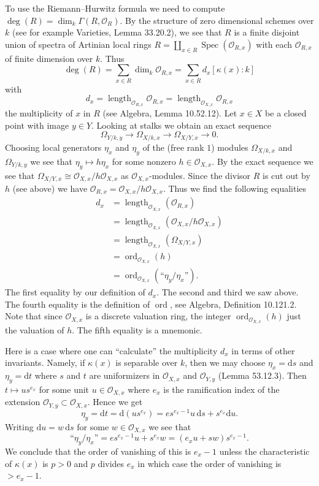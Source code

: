 \documentclass[UTF8,11pt]{ctexart}
\theoremstyle{definition}
\DeclareMathOperator{\Spec}{Spec}
\begin{document}
To use the Riemann--Hurwitz formula we need to compute $\deg(R)=\dim_k\Gamma(R,\mathcal O_R)$. By the structure of zero dimensional schemes over $k$ (see for example Varieties, Lemma 33.20.2), we see that $R$ is a finite disjoint union of spectra of Artinian local rings $R=\coprod_{x\in R}\Spec(\mathcal O_{R,x})$ with each $\mathcal O_{R,x}$ of finite dimension over $k$. Thus
\[\deg(R)=\sum_{x\in R}\dim_k\mathcal O_{R,x}=\sum_{x\in R}d_x[\kappa(x):k]\]
with
\[d_x=\operatorname{length}_{\mathcal O_{R,x}}\mathcal O_{R,x}=\operatorname{length}_{\mathcal O_{X,x}}\mathcal O_{R,x}\]
the multiplicity of $x$ in $R$ (see Algebra, Lemma 10.52.12). Let $x\in X$ be a closed point with image $y\in Y$. Looking at stalks we obtain an exact sequence
\[\Omega_{Y/k,y}\to\Omega_{X/k,x}\to\Omega_{X/Y,x}\to0.\]
Choosing local generators $\eta_x$ and $\eta_y$ of the (free rank $1$) modules $\Omega_{X/k,x}$ and $\Omega_{Y/k,y}$ we see that $\eta_y\mapsto h\eta_x$ for some nonzero $h\in\mathcal O_{X,x}$. By the exact sequence we see that $\Omega_{X/Y,x}\cong\mathcal O_{X,x}/h\mathcal O_{X,x}$ as $\mathcal O_{X,x}$-modules. Since the divisor $R$ is cut out by $h$ (see above) we have $\mathcal O_{R,x}=\mathcal O_{X,x}/h\mathcal O_{X,x}$. Thus we find the following equalities
\begin{align*}
d_x&=\operatorname{length}_{\mathcal O_{X,x}}(\mathcal O_{R,x})\\
&=\operatorname{length}_{\mathcal O_{X,x}}(\mathcal O_{X,x}/h\mathcal O_{X,x})\\
&=\operatorname{length}_{\mathcal O_{X,x}}(\Omega_{X/Y,x})\\
&=\operatorname{ord}_{\mathcal O_{X,x}}(h)\\
&=\operatorname{ord}_{\mathcal O_{X,x}}(\text{``}\eta_y/\eta_x\text{''}).
\end{align*}
The first equality by our definition of $d_x$. The second and third we saw above. The fourth equality is the definition of $\operatorname{ord}$, see Algebra, Definition 10.121.2. Note that since $\mathcal O_{X,x}$ is a discrete valuation ring, the integer $\operatorname{ord}_{\mathcal O_{X,x}}(h)$ just the valuation of $h$. The fifth equality is a mnemonic.

Here is a case where one can ``calculate'' the multiplicity $d_x$ in terms of other invariants. Namely, if $\kappa(x)$ is separable over $k$, then we may choose $\eta_x=\mathrm ds$ and $\eta_y=\mathrm dt$ where $s$ and $t$ are uniformizers in $\mathcal O_{X,x}$ and $\mathcal O_{Y,y}$ (Lemma 53.12.3). Then $t\mapsto us^{e_x}$ for some unit $u\in\mathcal O_{X,x}$ where $e_x$ is the ramification index of the extension $\mathcal O_{Y,y}\subset\mathcal O_{X,x}$. Hence we get
\[\eta_y=\mathrm dt=\mathrm d(us^{e_x})=es^{e_x-1}u\,\mathrm ds+s^{e_x}\mathrm du.\]
Writing $\mathrm du=w\,\mathrm ds$ for some $w\in\mathcal O_{X,x}$ we see that
\[\text{``}\eta_y/\eta_x\text{''}=es^{e_x-1}u+s^{e_x}w=(e_xu+sw)s^{e_x-1}.\]
We conclude that the order of vanishing of this is $e_x-1$ unless the characteristic of $\kappa(x)$ is $p>0$ and $p$ divides $e_x$ in which case the order of vanishing is $>e_x-1$.
\end{document}

